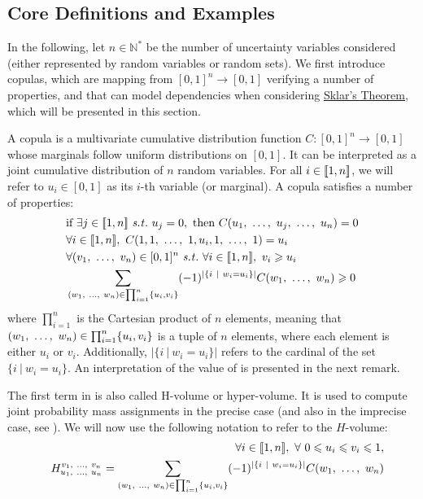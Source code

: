 \subsection{Core Definitions and Examples}\label{sec:copula_def}
In the following, let $n\in\mathbb{N}^*$ be the number of uncertainty variables considered (either represented by random variables or random sets). We first introduce copulas, which are mapping from $[0,1]^n\rightarrow [0,1]$ verifying a number of properties, and that can model dependencies when considering \hyperref[theorem:sklar]{Sklar's Theorem}, which will be presented in this section.

\begin{definition}
     A copula is a multivariate cumulative distribution function $C:[0,1]^{n}\rightarrow [0,1]$ whose marginals follow uniform distributions on $[0,1]$. It can be interpreted as a joint cumulative distribution of $n$ random variables. For all $i\in[\![ 1,n]\!] $, we will refer to $u_i\in[0,1]$ as its $i$-th variable (or marginal). A copula satisfies a number of properties:
\begin{align}
    &\text{if }\exists j\in\opi 1,n\cli  \text{ \st }~u_j=0, \text{ then }C(u_1\enum u_j\enum u_n)=0\label{eq:zero_copula}\\
    &\forall i\in\opi 1,n\cli ,~C(1,1\enum1,u_i,1\enum1)=u_i\label{eq:copula_ones}\\
    &\forall (v_1\enum v_n)\in[0,1]^n \text{ \st }~\forall i\in\opi 1,n\cli ,~v_i\geqslant u_i\nonumber\\
    &\sum_{(w_1\enum w_n)\in\prod_{i=1}^n\{u_i, v_i\}}(-1)^{|\{i~|~w_i=u_i\}|}C(w_1\enum w_n)\geqslant 0\label{eq:cop_hvolume}
\end{align}
where $\prod_{i=1}^n$ is the Cartesian product of $n$ elements, meaning that $(w_1, ~\ldots, ~ w_n)\in\prod_{i=1}^n\{u_i, v_i\}$ is a tuple of $n$ elements, where each element is either $u_i$ or $v_i$. Additionally, $|\{i~|~w_i=u_i\}|$ refers to the cardinal of the set $\{i~|~w_i=u_i\}$. An interpretation of the value of  is presented in the next remark.
\end{definition}

The first term in  is also called H-volume or hyper-volume. It is used to compute joint probability mass assignments in the precise case (and also in the imprecise case, see ). We will now use the following notation to refer to the $H$-volume:
\begin{eqnarray}\label{eq:hvolume}
    &&\forall i\in[\![ 1,n]\!] ,~\forall~0\leqslant u_i \leqslant v_i \leqslant 1,\nonumber\\
    &&H^{v_1, ~\ldots, ~ v_n}_{u_1, ~\ldots, ~ u_n}=\sum_{(w_1, ~\ldots, ~ w_n)\in\prod_{i=1}^n\{u_i, v_i\}}(-1)^{|\{i~|~w_i=u_i\}|}C(w_1, ~\ldots, ~ w_n)
\end{eqnarray}

